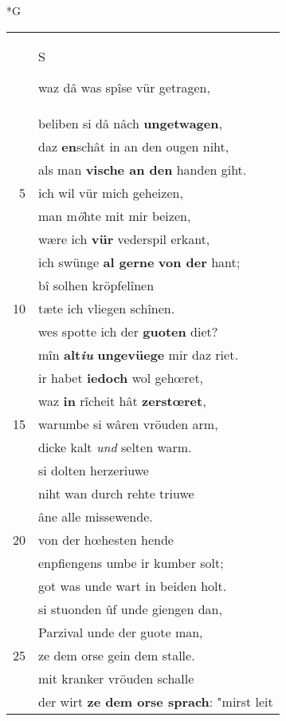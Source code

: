 \documentclass[8pt,a4paper,notitlepage]{article}
\begin{document}
\begin{table}[ht]
\begin{minipage}[t]{0.5\linewidth}
\small
\begin{center}*G
\end{center}
\begin{tabular}{rl}
 & \begin{large}S\end{large}waz dâ was spîse vür getragen,\\ 
 & beliben si dâ nâch \textbf{ungetwagen},\\ 
 & daz \textbf{en}schât in an den ougen niht,\\ 
 & als man \textbf{vische an den} handen giht.\\ 
5 & ich wil vür mich geheizen,\\ 
 & man m\textit{ö}hte mit mir beizen,\\ 
 & wære ich \textbf{vür} vederspil erkant,\\ 
 & ich swünge \textbf{al gerne} \textbf{von der} hant;\\ 
 & bî solhen kröpfelînen\\ 
10 & tæte ich vliegen schînen.\\ 
 & wes spotte ich der \textbf{guoten} diet?\\ 
 & mîn \textbf{alt\textit{iu}} \textbf{ungevüege} mir daz riet.\\ 
 & ir habet \textbf{iedoch} wol gehœret,\\ 
 & waz \textbf{in} rîcheit hât \textbf{zerstœret},\\ 
15 & warumbe si wâren vröuden arm,\\ 
 & dicke kalt \textit{und} selten warm.\\ 
 & si dolten herzeriuwe\\ 
 & niht wan durch rehte triuwe\\ 
 & âne alle missewende.\\ 
20 & von der hœhesten hende\\ 
 & enpfiengens umbe ir kumber solt;\\ 
 & got was unde wart in beiden holt.\\ 
 & si stuonden ûf unde giengen dan,\\ 
 & Parzival unde der guote man,\\ 
25 & ze dem orse gein dem stalle.\\ 
 & mit kranker vröuden schalle\\ 
 & der wirt \textbf{ze dem orse sprach}: "mirst leit\\ 

\end{tabular}
\end{minipage}
\end{table}
\end{document}
